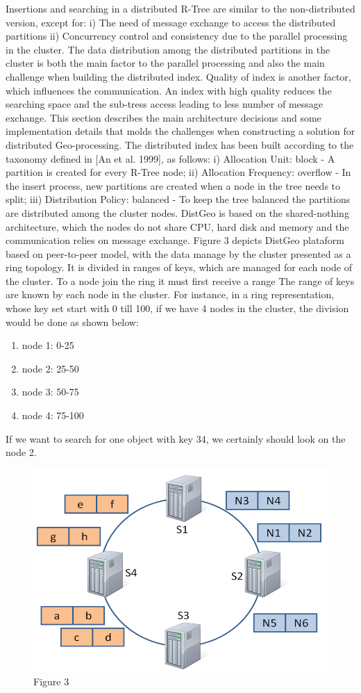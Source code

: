 Insertions and searching in a distributed R-Tree are similar to the non-distributed version, except for:
i) The need of message exchange to access the distributed partitions
ii) Concurrency control and consistency due to the parallel processing in the cluster.
	The data distribution among the distributed partitions in the cluster is both the main factor to the parallel processing and also the main challenge when building the distributed index.
	Quality of index is another factor, which influences the communication. An index with high quality reduces the searching space and the sub-tress access leading to less number of message exchange.
	This section describes the main architecture decisions and some implementation details that molds the challenges when constructing a solution for distributed Geo-processing.
	The distributed index has been built according to the taxonomy defined in [An et al. 1999], as follows:
	i) Allocation Unit: block - A partition is created for every R-Tree node;
	ii) Allocation Frequency: overflow - In the insert process, new partitions are created when a node in the tree needs to split;
	iii) Distribution Policy: balanced - To keep the tree balanced the partitions are distributed among the cluster nodes.
	DistGeo is based on the shared-nothing architecture, which the nodes do not share CPU, hard disk and memory and the communication relies on message exchange. Figure 3 depicts DistGeo plataform based on peer-to-peer model, with the data manage by the cluster presented as a ring topology. It is divided in ranges of keys, which are managed for each node of the cluster. To a node join the ring it must first receive a range
	The range of keys are known by each node in the cluster. For instance, in a ring representation, whose key set start with 0 till 100, if we have 4 nodes in the cluster, the division would be done as shown below:
\begin{enumerate}
 \item node 1: 0-25
  \item node 2: 25-50
  \item node 3: 50-75
  \item node 4: 75-100
\end{enumerate}

If we want to search for one object with key 34, we certainly should look on the node 2.

\begin{figure}[ht]
\centering
\includegraphics[width=.5\textwidth]{figure3.png}
\caption{Figure 3}
\label{fig: Figure 3}
\end{figure}

